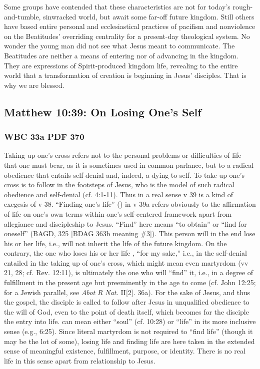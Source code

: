 			Some groups have contended that these characteristics are not for today's rough-and-tumble, sinwracked world, but await some far-off future kingdom. Still others have based entire personal and ecclesiastical practices of pacifism and nonviolence on the Beatitudes' overriding centrality for a present-day theological system. No wonder the young man did not see what Jesus meant to communicate. The Beatitudes are neither a means of entering nor of advancing in the kingdom. They are expressions of Spirit-produced kingdom life, revealing to the entire world that a transformation of creation is beginning in Jesus' disciples. That is why we are blessed. 
			
	\subsection{Matthew 10:39: On Losing One's Self}
		\label{EXSS-NT-MATTHEW-10-39-SELF}
		
		\subsubsection{WBC 33a PDF 370}
		
			Taking up one's cross refers not to the personal problems or difficulties of life that one must bear, as it is sometimes used in common parlance, but to a radical obedience that entails self-denial and, indeed, a dying to self. To take up one's cross is to follow in the footsteps of Jesus, who is the model of such radical obedience and self-denial (cf. 4:1-11). Thus in a real sense v 39 is a kind of exegesis of v 38. ``Finding one's life'' () in v 39a refers obviously to the affirmation of life on one's own terms within one's self-centered framework apart from allegiance and discipleship to Jesus. ``Find'' here means ``to obtain'' or ``find for oneself'' (BAGD, 325 [BDAG 363b meaning \#3]). This person will in the end lose his or her life, i.e., will not inherit the life of the future kingdom. On the contrary, the one who loses his or her life , ``for my sake,'' i.e., in the self-denial entailed in the taking up of one's cross, which might mean even martyrdom (vv 21, 28; cf. Rev. 12:11), is ultimately the one who will ``find'' it, i.e., in a degree of fulfillment in the present age but preeminently in the age to come (cf. John 12:25; for a Jewish parallel, see \textit{Abot R Nat.} II[2]. 36a). For the sake of Jesus, and thus the gospel, the disciple is called to follow after Jesus in unqualified obedience to the will of God, even to the point of death itself, which becomes for the disciple the entry into life.  can mean either ``soul'' (cf. 10:28) or ``life'' in its more inclusive sense (e.g., 6:25). Since literal martyrdom is not required to ``find life'' (though it may be the lot of some), losing life and finding life are here taken in the extended sense of meaningful existence, fulfillment, purpose, or identity. There is no real life in this sense apart from relationship to Jesus.
			
